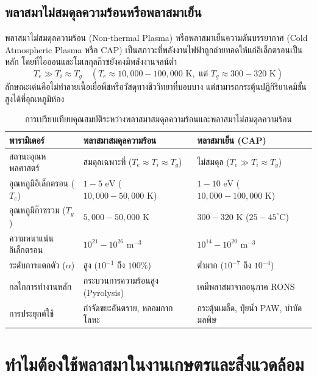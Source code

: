 \subsection{พลาสมาไม่สมดุลความร้อนหรือพลาสมาเย็น}

พลาสมาไม่สมดุลความร้อน (Non-thermal Plasma) หรือพลาสมาเย็นความดันบรรยากาศ (Cold Atmospheric Plasma หรือ CAP) เป็นสภาวะที่พลังงานไฟฟ้าถูกถ่ายทอดให้แก่อิเล็กตรอนเป็นหลัก โดยที่ไอออนและโมเลกุลก๊าซยังคงมีพลังงานจลน์ต่ำ
\begin{equation}
    T_e \gg T_i \approx T_g \quad (T_e \approx 10,000 - 100,000\text{ K}, \text{ แต่ } T_g \approx 300 - 320\text{ K})
\end{equation}
ลักษณะเด่นคือไม่ทำลายเนื้อเยื่อพืชหรือวัสดุทางชีววิทยาที่บอบบาง แต่สามารถกระตุ้นปฏิกิริยาเคมีขั้นสูงได้ที่อุณหภูมิห้อง

\begin{table}[H]
\caption{การเปรียบเทียบคุณสมบัติระหว่างพลาสมาสมดุลความร้อนและพลาสมาไม่สมดุลความร้อน}
\label{tab:plasma_comparison}
\begin{tabularx}{\textwidth}{p{3.2cm}X X}
\toprule
\textbf{พารามิเตอร์} & \textbf{พลาสมาสมดุลความร้อน} & \textbf{พลาสมาเย็น (CAP)} \\
\midrule
สถานะอุณหพลศาสตร์ & สมดุลเฉพาะที่ ($T_e \approx T_i \approx T_g$) & ไม่สมดุล ($T_e \gg T_i \approx T_g$) \\
อุณหภูมิอิเล็กตรอน ($T_e$) & $1 - 5\text{ eV}$ ($10,000 - 50,000\text{ K}$) & $1 - 10\text{ eV}$ ($10,000 - 100,000\text{ K}$) \\
อุณหภูมิก๊าซรวม ($T_g$) & $5,000 - 50,000\text{ K}$ & $300 - 320\text{ K}$ ($25 - 45^\circ\text{C}$) \\
ความหนาแน่นอิเล็กตรอน & $10^{21} - 10^{26}\text{ m}^{-3}$ & $10^{14} - 10^{20}\text{ m}^{-3}$ \\
ระดับการแตกตัว ($\alpha$) & สูง ($10^{-1}$ ถึง $100\%$) & ต่ำมาก ($10^{-7}$ ถึง $10^{-4}$) \\
กลไกการทำงานหลัก & กระบวนการความร้อนสูง (Pyrolysis) & เคมีพลาสมาจากอนุภาค RONS \\
การประยุกต์ใช้ & กำจัดขยะอันตราย, หลอมกากโลหะ & กระตุ้นเมล็ด, ปุ๋ยน้ำ PAW, บำบัดมลพิษ \\
\bottomrule
\end{tabularx}
\end{table}

\section{ทำไมต้องใช้พลาสมาในงานเกษตรและสิ่งแวดล้อม}

